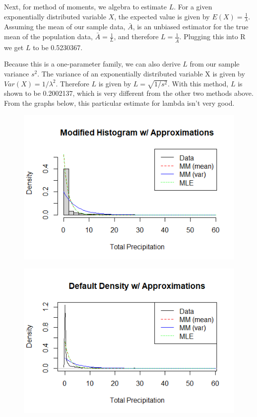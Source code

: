 \documentclass[12pt, a4paper, oneside]{report}
\begin{document}

Next, for method of moments, we algebra to estimate \(L\).
For a given exponentially distributed variable \(X\), the expected value is given by \(E(X) = \frac{1}{\lambda}\). Assuming the mean of our sample data, \(\bar{A}\), is an unbiased estimator for the true mean of the population data, \(\bar{A} = \frac{1}{L}\), and therefore \(L = \frac{1}{\bar{A}}\).
Plugging this into R we get \(L\) to be 0.5230367.


Because this is a one-parameter family, we can also derive \(L\) from our sample variance \(s^2\). The variance of an exponentially distributed variable X is given by \(Var(X) = 1 / \lambda^2\). Therefore \(L\) is given by \(L = \sqrt{1 / s^2}\).
With this method, \(L\) is shown to be 0.2002137, which is very different from the other two methods above. From the graphs below, this particular estimate for lambda isn't very good. 

\begin{figure}[h]
  \centering
  \includegraphics[width=0.7\linewidth]{expHistModifiedA.png}
\end{figure}

\begin{figure}[h]
  \centering
  \includegraphics[width=0.7\linewidth]{expDensityDefaultA.png}
\end{figure}
\end{document}
